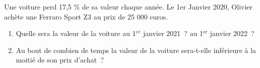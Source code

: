 \documentclass[exercice]{thedocument}%
\begin{document}
%
Une voiture perd 17,5 \% de sa valeur chaque année. Le 1er Janvier
2020, Olivier achète une Ferraro Sport Z3 au prix de 25 000 euros.
\begin{enumerate}
    \item Quelle sera la valeur de la voiture au 1$^{er}$ janvier 2021~? au
    1$^{\text{er}}$ janvier 2022~?
    \item Au bout de combien de temps la valeur de la voiture sera-t-elle
    inférieure à la moitié de son prix d'achat~?
\end{enumerate}
\end{document}
